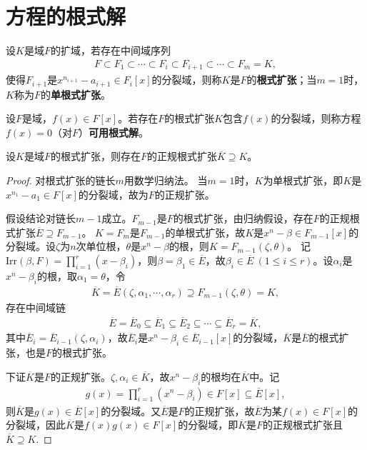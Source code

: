 \documentclass[../../main.tex]{subfiles}%
\begin{document}
\section{方程的根式解}

\begin{definition}
设$K$是域$F$的扩域，若存在中间域序列
\begin{align}
F\subset F_1\subset\cdots\subset F_i\subset F_{i+1}\subset\cdots\subset F_m=K,\label{eq:radical_ext_seq}
\end{align}
使得$F_{i+1}$是$x^{n_{i+1}}-a_{i+1}\in F_i[x]$的分裂域，则称$K$是$F$的\textbf{根式扩张}；当$m=1$时，$K$称为$F$的\textbf{单根式扩张}。
\end{definition}

\begin{definition}
设$F$是域，$f(x)\in F[x]$。若存在$F$的根式扩张$K$包含$f(x)$的分裂域，则称方程$f(x)=0$（对$F$）\textbf{可用根式解}。
\end{definition}

\begin{theorem}
设$K$是域$F$的根式扩张，则存在$F$的正规根式扩张$\overline{K}\supseteq K$。
\end{theorem}
\begin{proof}

对根式扩张的链长$m$用数学归纳法。
当$m=1$时，$K$为单根式扩张，即$K$是$x^{n_1}-a_1\in F[x]$的分裂域，故为$F$的正规扩张。

假设结论对链长$m-1$成立。$F_{m-1}$是$F$的根式扩张，由归纳假设，存在$F$的正规根式扩张$\overline{E}\supseteq F_{m-1}$。
$K=F_m$是$F_{m-1}$的单根式扩张，故$K$是$x^n-\beta\in F_{m-1}[x]$的分裂域。设$\zeta$为$n$次单位根，$\theta$是$x^n-\beta$的根，则$K=F_{m-1}(\zeta,\theta)$。
记$\mathrm{Irr}(\beta,F)=\prod\limits_{i=1}^r(x-\beta_i)$，则$\beta=\beta_1\in\overline{E}$，故$\beta_i\in\overline{E}\ (1\leqslant i\leqslant r)$。设$\alpha_i$是$x^n-\beta_i$的根，取$\alpha_1=\theta$，令
\begin{align*}
\overline{K}=\overline{E}(\zeta,\alpha_1,\cdots,\alpha_r)\supseteq F_{m-1}(\zeta,\theta)=K,
\end{align*}
存在中间域链
\begin{align*}
\overline{E}=\overline{E}_0\subseteq\overline{E}_1\subseteq\overline{E}_2\subseteq\cdots\subseteq\overline{E}_r=\overline{K},
\end{align*}
其中$\overline{E}_i=\overline{E}_{i-1}(\zeta,\alpha_i)$，故$\overline{E}_i$是$x^n-\beta_i\in\overline{E}_{i-1}[x]$的分裂域，$\overline{K}$是$\overline{E}$的根式扩张，也是$F$的根式扩张。

下证$\overline{K}$是$F$的正规扩张。$\zeta,\alpha_i\in\overline{K}$，故$x^n-\beta_i$的根均在$\overline{K}$中。记
\begin{align*}
g(x)=\prod\limits_{i=1}^r(x^n-\beta_i)\in F[x]\subseteq\overline{E}[x],
\end{align*}
则$\overline{K}$是$g(x)\in\overline{E}[x]$的分裂域。又$\overline{E}$是$F$的正规扩张，故$\overline{E}$为某$f(x)\in F[x]$的分裂域，因此$\overline{K}$是$f(x)g(x)\in F[x]$的分裂域，即$\overline{K}$是$F$的正规根式扩张且$\overline{K}\supseteq K$.

\end{proof}
\end{document}
